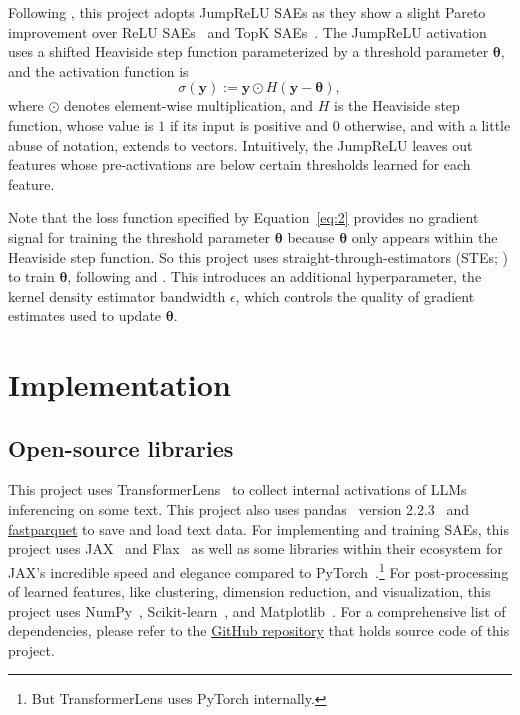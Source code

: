 \documentclass{article}
\begin{document}
Following \cite{lieberum2024Gemma}, this project adopts JumpReLU SAEs as they show a slight Pareto
improvement over ReLU SAEs~\citep{cunningham2023Sparse} and TopK SAEs~\citep{gao2024Scaling}. The
JumpReLU activation uses a shifted Heaviside step function parameterized by a threshold
parameter \(\bm{\theta}\), and the activation function is
\begin{equation}
\label{eq:3}
\sigma \left( \mathbf{y} \right) := \mathbf{y} \odot H \left( \mathbf{y} - \bm{\theta} \right),
\end{equation}
where \(\odot\) denotes element-wise multiplication, and \(H\) is the Heaviside step function, whose
value is \(1\) if its input is positive and \(0\) otherwise, and with a little abuse of notation,
extends to vectors. Intuitively, the JumpReLU leaves out features whose pre-activations are below
certain thresholds learned for each feature.

Note that the loss function specified by Equation~\ref{eq:2} provides no gradient signal for
training the threshold parameter \(\bm{\theta}\) because \(\bm{\theta}\) only appears within the Heaviside
step function. So this project uses straight-through-estimators (STEs; \cite{bengio2013Estimating})
to train \(\bm{\theta}\), following \cite{rajamanoharan2024Jumping} and \cite{lieberum2024Gemma}. This
introduces an additional hyperparameter, the kernel density estimator bandwidth \(\epsilon\), which
controls the quality of gradient estimates used to update \(\bm{\theta}\).

\section{Implementation}
\label{sec:implementation}

\subsection{Open-source libraries}
\label{sec:open-source-libr}

This project uses TransformerLens~\citep{nanda2022TransformerLens} to collect internal activations
of LLMs inferencing on some text. This project also uses pandas~\citep{mckinney2010Data} version
2.2.3~\citep{thepandasdevelopmentteam2024Pandasdev} and
\href{https://github.com/dask/fastparquet}{fastparquet} to save and load text data. For implementing
and training SAEs, this project uses JAX~\citep{jax2018github} and Flax~\citep{flax2020github} as
well as some libraries within their ecosystem for JAX's incredible speed and elegance compared to
PyTorch~\citep{ansel2024PyTorch}.\footnote{But TransformerLens uses PyTorch internally.} For
post-processing of learned features, like clustering, dimension reduction, and visualization, this
project uses NumPy~\citep{harris2020Array}, Scikit-learn~\citep{pedregosa2011Scikitlearn}, and
Matplotlib~\citep{hunter2007Matplotlib}. For a comprehensive list of dependencies, please refer to
the \href{https://github.com/gzqaq/aiaa-5047-project}{GitHub repository} that holds source code of
this project.
\end{document}
